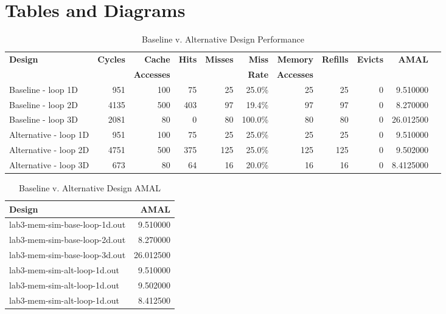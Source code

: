 \documentclass[10pt]{article}
\begin{document}
\pagebreak[4]


\section {Tables and Diagrams}



\begin{table}[h]
\begin{center}
\begin{tabular} {|l | r | r | r | r | r | r | r | r | r | r |}

\hline
\textbf{Design}    & \textbf{Cycles} & \textbf{Cache} & \textbf{Hits} & \textbf{Misses} & \textbf{Miss} & \textbf{Memory} & \textbf{Refills} & \textbf{Evicts} & \textbf{AMAL} \\
&&\textbf{Accesses}&&&\textbf{Rate}&\textbf{Accesses}&&& \\
\hline
Baseline - loop 1D       &  951   &  100   &  75   &  25  &	 25.0\%  &  25  &  25  &  0  &  9.510000	\\
Baseline - loop 2D 	     &  4135  &  500   &  403  &  97  &	 19.4\%  &  97  &  97  &  0  &  8.270000	\\
Baseline - loop 3D       &  2081  &  80    &  0    &  80  &	 100.0\% &  80  &  80  &  0  &  26.012500	\\
\hline
Alternative - loop 1D    &  951   &  100   &  75   &  25  &	 25.0\%  &  25  &  25  &  0  &  9.510000	\\
Alternative - loop 2D    &  4751  &  500   &  375  &  125 &	 25.0\%  &  125 &  125 &  0  &  9.502000	\\
Alternative - loop 3D    &  673   &  80    &  64   &  16  &	 20.0\%  &  16  &  16  &  0  &  8.4125000	\\
\hline                    
\end{tabular}
\caption{Baseline v. Alternative Design Performance}
\label{tab:eval}
\end{center}
\end{table}



\begin{table}[h]
\begin{center}
\begin{tabular} {|l | r |}

\hline
\textbf{Design} & \textbf{AMAL} \\
\hline
lab3-mem-sim-base-loop-1d.out & 9.510000  \\
lab3-mem-sim-base-loop-2d.out & 8.270000  \\
lab3-mem-sim-base-loop-3d.out & 26.012500 \\
lab3-mem-sim-alt-loop-1d.out  & 9.510000  \\
lab3-mem-sim-alt-loop-1d.out  & 9.502000  \\
lab3-mem-sim-alt-loop-1d.out  & 8.412500  \\
\hline
\end{tabular}
\caption{Baseline v. Alternative Design AMAL}
\label{tab:amal}
\end{center}
\end{table}
\end{document}
